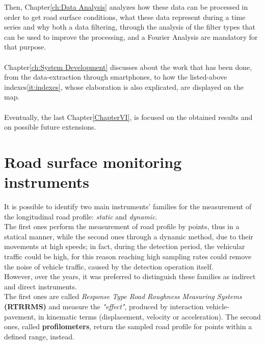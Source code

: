 \documentclass[tesi]{subfiles}
\begin{document}
Then, Chapter\ref{ch:Data Analysis} analyzes how these data can be processed in order to get road surface conditions, what these data represent during a time series and why both a data filtering, through the analysis of the filter types that can be used to improve the processing, and a Fourier Analysis are mandatory for that purpose.\\\\
Chapter\ref{ch:System Development} discusses about the work that has been done, from the data-extraction through smartphones, to how the listed-above indexes\ref{it:indexes}, whose elaboration is also explicated, are displayed on the map.\\\\
Eventually, the last Chapter\ref{ChapterVI}, is focused on the obtained results and on possible future extensions.
\clearpage
	\section{Road surface monitoring instruments}\label{sc:Instruments}
\noindent It is possible to identify two main instruments' families for the measurement of the longitudinal road profile: \emph{static} and \emph{dynamic}.\\ The first ones perform the measurement of road profile by points, thus in a statical manner, while the second ones through a dynamic method, due to their movements at high speeds; in fact, during the detection period, the vehicular traffic could be high, for this reason reaching high sampling rates could remove the noise of vehicle traffic, caused by the detection operation itself.\\However, over the years, it was preferred to distinguish these families as indirect and direct instruments.\\ The first ones are called \textit{Response Type Road Roughness Measuring Systems} \textbf{(RTRRMS)} and measure the \textit{"effect"}, produced by interaction vehicle-pavement, in kinematic terms (displacement, velocity or acceleration). The second ones, called \textbf{profilometers}, return the sampled road profile for points within a defined range, instead.
\end{document}
